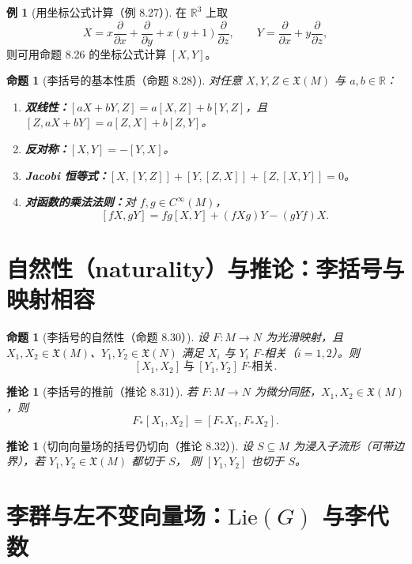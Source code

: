 \documentclass[11pt,a4paper]{article}
\newcommand{\R}{\mathbb{R}}
\newcommand{\Lie}{\mathrm{Lie}}
\newcommand{\X}{\mathfrak{X}} %
\theoremstyle{definition}
\newtheorem{example}[definition]{例}
\theoremstyle{plain}
\newtheorem{proposition}[definition]{命题}
\newtheorem{corollary}[definition]{推论}
\begin{document}
\begin{example}[用坐标公式计算（例 8.27）]
在 $\R^3$ 上取
\[
X= x\frac{\partial}{\partial x}+\frac{\partial}{\partial y}+x(y+1)\frac{\partial}{\partial z},\qquad
Y=\frac{\partial}{\partial x}+y\frac{\partial}{\partial z},
\]
则可用命题 8.26 的坐标公式计算 $[X,Y]$。
\end{example}

\begin{proposition}[李括号的基本性质（命题 8.28）]
对任意 $X,Y,Z\in\X(M)$ 与 $a,b\in\R$：
\begin{enumerate}[label=(\alph*)]
\item \textbf{双线性：}\quad $[aX+bY,Z]=a[X,Z]+b[Y,Z]$，且 $[Z,aX+bY]=a[Z,X]+b[Z,Y]$。
\item \textbf{反对称：}\quad $[X,Y]=-[Y,X]$。
\item \textbf{Jacobi 恒等式：}\quad $[X,[Y,Z]]+[Y,[Z,X]]+[Z,[X,Y]]=0$。
\item \textbf{对函数的乘法法则：}\quad 对 $f,g\in C^\infty(M)$，
\[
[fX,gY]=fg[X,Y]+(fXg)Y-(gYf)X. \tag{8.11}
\]
\end{enumerate}
\end{proposition}

\section{自然性（naturality）与推论：李括号与映射相容}

\begin{proposition}[李括号的自然性（命题 8.30）]
设 $F:M\to N$ 为光滑映射，且 $X_1,X_2\in\X(M)$、$Y_1,Y_2\in\X(N)$ 满足
$X_i$ 与 $Y_i$ $F$-相关（$i=1,2$）。则
\[
[X_1,X_2]\ \text{与}\ [Y_1,Y_2]\ \text{$F$-相关}.
\]
\end{proposition}

\begin{corollary}[李括号的推前（推论 8.31）]
若 $F:M\to N$ 为微分同胚，$X_1,X_2\in\X(M)$，则
\[
F_*[X_1,X_2]=[F_*X_1,F_*X_2].
\]
\end{corollary}

\begin{corollary}[切向向量场的括号仍切向（推论 8.32）]
设 $S\subseteq M$ 为浸入子流形（可带边界），若 $Y_1,Y_2\in\X(M)$ 都切于 $S$，
则 $[Y_1,Y_2]$ 也切于 $S$。
\end{corollary}

\section{李群与左不变向量场：$\Lie(G)$ 与李代数}
\end{document}
